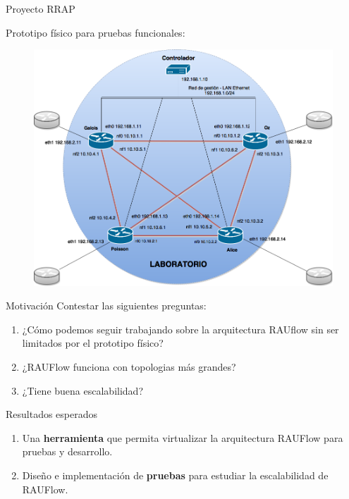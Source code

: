 \documentclass[xcolor=svgnames]{beamer}
\begin{document}
\begin{frame}{Proyecto RRAP}
	\begin{center}
		Prototipo físico para pruebas funcionales:
		\begin{figure}[t]
			\includegraphics[scale=0.25]{topologia_rrap}
		\end{figure}
	\end{center}
\end{frame}

\begin{frame}{Motivación}
	Contestar las siguientes preguntas:
	\pause
	\begin{enumerate}
		\item ¿Cómo podemos seguir trabajando sobre la arquitectura RAUflow sin ser limitados por el prototipo físico?
		\pause
		\item ¿RAUFlow funciona con topologias más grandes?
		\pause
		\item ¿Tiene buena escalabilidad?
	\end{enumerate}
\end{frame}

\begin{frame}{Resultados esperados}
	\pause
	\begin{enumerate}
		\item Una \textbf{herramienta} que permita virtualizar la arquitectura RAUFlow para pruebas y desarrollo.
		\pause
		\item Diseño e implementación de \textbf{pruebas} para estudiar la escalabilidad de RAUFlow.
	\end{enumerate}
\end{frame}
\end{document}
